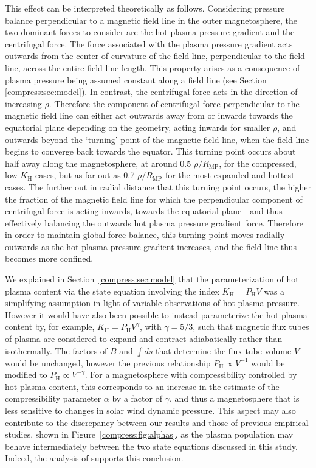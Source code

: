 This effect can be interpreted theoretically as follows. Considering pressure balance perpendicular to a magnetic field line in the outer magnetosphere, the two dominant forces to consider are the hot plasma pressure gradient and the centrifugal force. The force associated with the plasma pressure gradient acts outwards from the center of curvature of the field line, perpendicular to the field line, across the entire field line length. This property arises as a consequence of plasma pressure being assumed constant along a field line (see Section \ref{compress:sec:model}). In contrast, the centrifugal force acts in the direction of increasing $\rho$. Therefore the component of centrifugal force perpendicular to the magnetic field line can either act outwards away from or inwards towards the equatorial plane depending on the geometry, acting inwards for smaller $\rho$, and outwards beyond the `turning' point of the magnetic field line, when the field line begins to converge back towards the equator. This turning point occurs about half away along the magnetosphere, at around 0.5 $\rho/R_\mathrm{MP}$, for the compressed, low $K_\mathrm{H}$ cases, but as far out as 0.7 $\rho/R_\mathrm{MP}$ for the most expanded and hottest cases. The further out in radial distance that this turning point occurs, the higher the fraction of the magnetic field line for which the perpendicular component of centrifugal force is acting inwards, towards the equatorial plane - and thus effectively balancing the outwards hot plasma pressure gradient force. Therefore in order to maintain global force balance, this turning point moves radially outwards as the hot plasma pressure gradient increases, and the field line thus becomes more confined.

We explained in Section~\ref{compress:sec:model} that the parameterization of hot plasma content via the state equation involving the index $K_\mathrm{H}=P_\mathrm{H}V$ was a simplifying assumption in light of variable observations of hot plasma pressure. However it would have also been possible to instead parameterize the hot plasma content by, for example, $K_\mathrm{H}=P_\mathrm{H}V^\gamma$, with $\gamma=5/3$, such that magnetic flux tubes of plasma are considered to expand and contract adiabatically rather than isothermally. The factors of $B$ and $\int ds$ that determine the flux tube volume $V$ would be unchanged, however the previous relationship $P_\mathrm{H}\propto V^{-1}$ would be modified to $P_\mathrm{H} \propto V^{-\gamma}$. For a magnetosphere with compressibility controlled by hot plasma content, this corresponds to an increase in the estimate of the compressibility parameter $\alpha$ by a factor of $\gamma$, and thus a magnetosphere that is less sensitive to changes in solar wind dynamic pressure. This aspect may also contribute to the discrepancy between our results and those of previous empirical studies, shown in Figure~\ref{compress:fig:alphas}, as the plasma population may behave intermediately between the two state equations discussed in this study. Indeed, the analysis of \citet{achilleos2010a} supports this conclusion.

